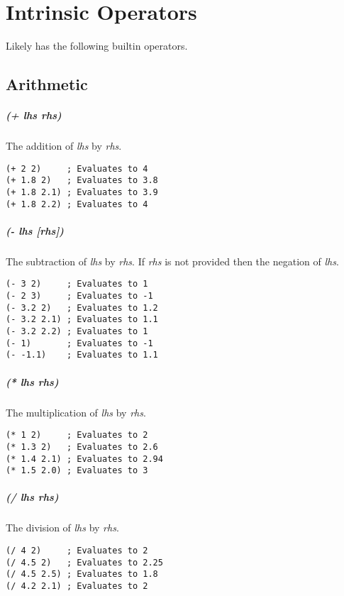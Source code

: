 \documentclass[numbers=noenddot]{scrbook}
\begin{document}
\chapter{Intrinsic Operators}
Likely has the following builtin operators.

\section{Arithmetic}
\paragraph{(+ \emph{lhs} \emph{rhs})}
The addition of \emph{lhs} by \emph{rhs}.

\begin{verbatim}
(+ 2 2)     ; Evaluates to 4
(+ 1.8 2)   ; Evaluates to 3.8
(+ 1.8 2.1) ; Evaluates to 3.9
(+ 1.8 2.2) ; Evaluates to 4
\end{verbatim}

\paragraph{(- \emph{lhs} [\emph{rhs}])}
The subtraction of \emph{lhs} by \emph{rhs}.
If \emph{rhs} is not provided then the negation of \emph{lhs}.

\begin{verbatim}
(- 3 2)     ; Evaluates to 1
(- 2 3)     ; Evaluates to -1
(- 3.2 2)   ; Evaluates to 1.2
(- 3.2 2.1) ; Evaluates to 1.1
(- 3.2 2.2) ; Evaluates to 1
(- 1)       ; Evaluates to -1
(- -1.1)    ; Evaluates to 1.1
\end{verbatim}

\paragraph{(* \emph{lhs} \emph{rhs})}
The multiplication of \emph{lhs} by \emph{rhs}.

\begin{verbatim}
(* 1 2)     ; Evaluates to 2
(* 1.3 2)   ; Evaluates to 2.6
(* 1.4 2.1) ; Evaluates to 2.94
(* 1.5 2.0) ; Evaluates to 3
\end{verbatim}

\paragraph{(/ \emph{lhs} \emph{rhs})}
The division of \emph{lhs} by \emph{rhs}.

\begin{verbatim}
(/ 4 2)     ; Evaluates to 2
(/ 4.5 2)   ; Evaluates to 2.25
(/ 4.5 2.5) ; Evaluates to 1.8
(/ 4.2 2.1) ; Evaluates to 2
\end{verbatim}
\end{document}
